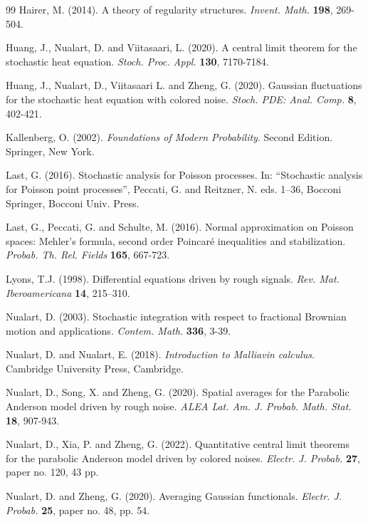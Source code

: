 \documentclass[12pt]{article}
\begin{document}
\begin{thebibliography}{99}
 Hairer, M. (2014). A theory of regularity structures. {\em Invent. Math.} {\bf 198}, 269-504.    
    
 Huang, J., Nualart, D. and Viitasaari, L. (2020). A central limit theorem for the stochastic heat equation. {\em Stoch. Proc. Appl.} {\bf 130}, %
    7170-7184.

 Huang, J., Nualart, D., Viitasaari L. and Zheng, G. (2020). Gaussian fluctuations for the stochastic
heat equation with colored noise. {\em Stoch. PDE: Anal. Comp.} {\bf 8}, 402-421.


 Kallenberg, O. (2002). {\em  Foundations of Modern Probability}. Second Edition. Springer, New York.    
    

 Last, G. (2016). Stochastic analysis for Poisson processes.
In:  ``Stochastic analysis for Poisson point processes'', Peccati, G. and Reitzner, N. eds.
1--36, Bocconi Springer, Bocconi Univ. Press.

Last, G.,  Peccati, G. and  Schulte, M. (2016).
Normal approximation on Poisson spaces:
Mehler's formula, second order Poincar\'e inequalities and stabilization.
{\em Probab. Th. Rel. Fields} {\bf 165}, 667-723.

 Lyons, T.J. (1998). Differential equations driven by rough signals. {\em Rev. Mat. Iberoamericana} {\bf 14}, 215–310. 

 Nualart, D. (2003). Stochastic integration with respect to
 fractional Brownian motion and applications. {\em Contem. Math.}
 {\bf 336}, 3-39.
 

 Nualart, D. and Nualart, E. (2018). {\em Introduction to Malliavin calculus}.
Cambridge University Press, Cambridge. 
 
  Nualart, D., Song, X. and Zheng, G. (2020). Spatial averages for the Parabolic Anderson model driven by rough noise. {\em  ALEA Lat. Am. J. Probab. Math. Stat.} {\bf 18}, %
    907-943.

 Nualart, D., Xia, P. and Zheng, G. (2022).  Quantitative central limit theorems for the parabolic Anderson model driven by colored noises. {\em Electr. J. Probab.} {\bf 27}, paper no. 120, 43 pp.

 Nualart, D. and Zheng, G. (2020). Averaging Gaussian functionals. {\em Electr. J. Probab.} {\bf 25}, paper no. 48, pp. 54.


\end{thebibliography}
\end{document}
